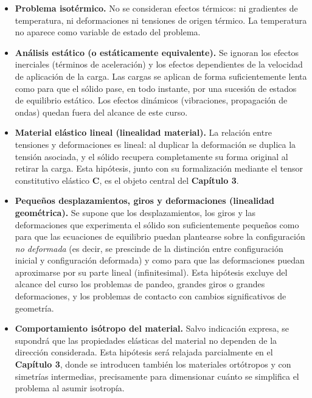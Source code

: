 \begin{itemize}[leftmargin=1.4em]
\item \textbf{Problema isotérmico.} No se consideran efectos térmicos: ni gradientes de temperatura, ni deformaciones ni tensiones de origen térmico. La temperatura no aparece como variable de estado del problema.
\item \textbf{Análisis estático (o estáticamente equivalente).} Se ignoran los efectos inerciales (términos de aceleración) y los efectos dependientes de la velocidad de aplicación de la carga. Las cargas se aplican de forma suficientemente lenta como para que el sólido pase, en todo instante, por una sucesión de estados de equilibrio estático. Los efectos dinámicos (vibraciones, propagación de ondas) quedan fuera del alcance de este curso.
\item \textbf{Material elástico lineal (linealidad material).} La relación entre tensiones y deformaciones es lineal: al duplicar la deformación se duplica la tensión asociada, y el sólido recupera completamente su forma original al retirar la carga. Esta hipótesis, junto con su formalización mediante el tensor constitutivo elástico $\bm{C}$, es el objeto central del \textbf{Capítulo 3}.
\item \textbf{Pequeños desplazamientos, giros y deformaciones (linealidad geométrica).} Se supone que los desplazamientos, los giros y las deformaciones que experimenta el sólido son suficientemente pequeños como para que las ecuaciones de equilibrio puedan plantearse sobre la configuración \emph{no deformada} (es decir, se prescinde de la distinción entre configuración inicial y configuración deformada) y como para que las deformaciones puedan aproximarse por su parte lineal (infinitesimal). Esta hipótesis excluye del alcance del curso los problemas de pandeo, grandes giros o grandes deformaciones, y los problemas de contacto con cambios significativos de geometría.
\item \textbf{Comportamiento isótropo del material.} Salvo indicación expresa, se supondrá que las propiedades elásticas del material no dependen de la dirección considerada. Esta hipótesis será relajada parcialmente en el \textbf{Capítulo 3}, donde se introducen también los materiales ortótropos y con simetrías intermedias, precisamente para dimensionar cuánto se simplifica el problema al asumir isotropía.
\end{itemize}

